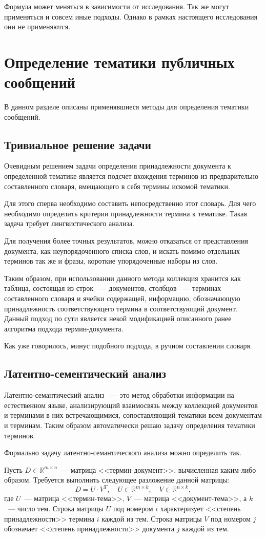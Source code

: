 \documentclass[annotation,times,page4]{itmo-student-thesis}
\begin{document}
Формула может меняться в зависимости от исследования. Так же могут применяться и совсем иные подходы. Однако в рамках настоящего исследования они не применяются.

\section{Определение тематики публичных сообщений}
В данном разделе описаны применявшиеся методы для определения тематики сообщений.
\subsection{Тривиальное решение задачи}
Очевидным решением задачи определения принадлежности документа к определенной тематике является подсчет вхождения терминов из предварительно составленного словаря, вмещающего в себя термины искомой тематики.

Для этого сперва необходимо составить непосредственно этот словарь. Для чего необходимо определить критерии принадлежности термина к тематике. Такая задача требует лингвистического анализа.

Для получения более точных результатов, можно отказаться от представления документа, как неупорядоченного списка слов, и искать помимо отдельных терминов так же и фразы, короткие упорядоченные наборы из слов.

Таким образом, при использовании данного метода коллекция хранится как таблица, состоящая из строк ~--- документов, столбцов ~--- терминах составленного словаря и ячейки содержащей, информацию, обозначающую принадлежность соответствующего термина в соответствующий документ. Данный подход по сути является некой модификацией описанного ранее алгоритма подхода термин-документа.

Как уже говорилось, минус подобного подхода, в ручном составлении словаря.
\subsection{Латентно-сементический анализ}
Латентно-семантический анализ ~--- это метод обработки информации на естественном языке, анализирующий взаимосвязь между коллекцией документов и терминами в них встречающимися, сопоставляющий тематики всем документам и терминам. Таким образом автоматически решаю задачу определения тематики терминов.

Формально задачу латентно-семантического анализа можно определить так.

Пусть $D \in \mathbb{R}^{m \times n}$~--- матрица 
<<термин-документ>>, вычисленная каким-либо образом. Требуется
выполнить следующее разложение данной матрицы:
\[
    D = U \cdot V^T,\quad U \in \mathbb{R}^{m \times k},\quad V \in \mathbb{R}^{n \times k},
\]
где $U$~--- матрица <<термин-тема>>, $V$~--- матрица <<документ-тема>>,
а $k$~--- число тем. Строка матрицы $U$ под номером $i$ 
характеризует <<степень принадлежности>> термина $i$ 
каждой из тем. Строка матрицы $V$ под номером $j$ обозначает
<<степень принадлежности>> документа $j$ каждой из тем.
\end{document}
